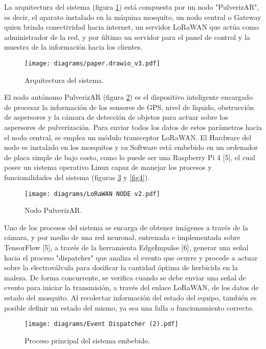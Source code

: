 \documentclass[conference]{IEEEtran}
\begin{document}
La arquitectura del sistema (figura \ref{fig}) está compuesta por un nodo "PulverizAR", es decir, el aparato instalado en la máquina mosquito, un nodo central o Gateway quien brinda conectividad hacia internet, un servidor LoRaWAN que actúa como administrador de la red, y por último un servidor para el panel de control y la muestra de la información hacia los clientes. 

\begin{figure}[htbp]
\centerline{\texttt{[image: diagrams/paper.drawio\_v3.pdf]}}
\caption{Arquitectura del sistema.}
\label{fig}
\end{figure}


El nodo autónomo PulverizAR (figura \ref{fig2}) es el dispositivo inteligente encargado de procesar la información de los sensores de GPS, nivel de líquido, obstrucción de aspersores y la cámara de detección de objetos para actuar sobre los aspersores de pulverización. Para enviar todos los datos de estos parámetros hacia el nodo central, se emplea un módulo transceptor LoRaWAN. El Hardware del nodo es instalado en los mosquitos y su Software está embebido en un ordenador de placa simple de bajo costo, como lo puede ser una Raspberry Pi 4 [5], el cual posee un sistema operativo Linux capaz de manejar los procesos y funcionalidades del sistema (figuras \ref{fig3} y \ref{fig4}). 


\begin{figure}[htbp]
\centerline{\texttt{[image: diagrams/LoRaWAN NODE v2.pdf]}}
\caption{Nodo PulverizAR.}
\label{fig2}
\end{figure}

Uno de los procesos del sistema se encarga de obtener imágenes a través de la cámara, y por medio de una red neuronal, entrenada e implementada sobre TensorFlow [5], a través de la herramienta EdgeImpulse [6], generar una señal hacia el proceso "dispatcher" que analiza el evento que ocurre y procede a actuar sobre la electroválvula para dosificar la cantidad óptima de herbicida en la maleza. De forma concurrente, se verifica cuando se debe enviar una señal de evento para iniciar la transmisión, a través del enlace LoRaWAN, de los datos de estado del mosquito. Al recolectar información del estado del equipo, también es posible definir un estado del mismo, ya sea una falla o funcionamiento correcto.


\begin{figure}[htbp]
\centerline{\texttt{[image: diagrams/Event Dispatcher (2).pdf]}}
\caption{Proceso principal del sistema embebido.}
\label{fig3}
\end{figure}
\end{document}
